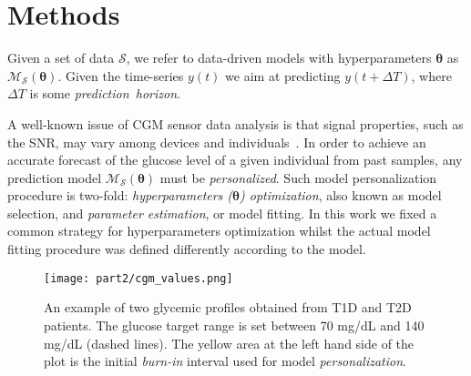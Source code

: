 \section{Methods}


Given a set of data $\mathcal{S}$, we refer to data-driven models with hyperparameters $\bm{\theta}$ as $\mathcal{M}_\mathcal{S}(\bm{\theta})$.
Given the time-series $y(t)$ we aim at predicting $y(t+\Delta T)$, where $\Delta T$ is some {\em prediction~horizon}.

A well-known issue of CGM sensor data analysis is that signal properties, such as the SNR, may vary among devices and individuals~\cite{facchinetti2010online}. In order to achieve an accurate forecast of the glucose level of a given individual from past samples, any prediction model $\mathcal{M}_\mathcal{S}(\bm{\theta})$ must be {\em personalized}. Such model personalization procedure is two-fold: {\em hyperparameters ($\bm{\theta}$) optimization}, also known as model selection, and {\em parameter estimation}, or model fitting. 
In this work we fixed a common strategy for hyperparameters optimization whilst the actual model fitting procedure was defined differently according to the model. 

\begin{figure}[h!]
	\caption{An example of two glycemic profiles obtained from T1D and T2D patients. The glucose target range is set between 70 mg/dL and 140 mg/dL (dashed lines). The yellow area at the left hand side of the plot is the initial {\em burn-in} interval used for model {\em personalization}.}\label{fig:cgm}
	\centering
	\texttt{[image: part2/cgm\_values.png]}
\end{figure}

